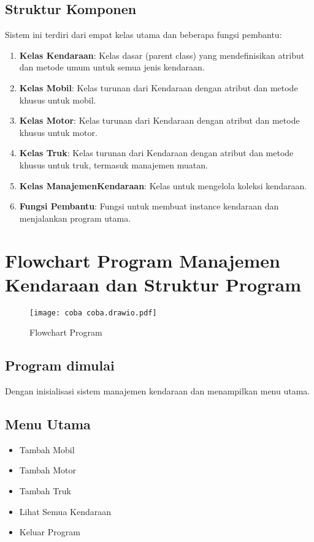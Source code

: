 \documentclass[12pt]{article}
\begin{document}
\subsection{Struktur Komponen}
Sistem ini terdiri dari empat kelas utama dan beberapa fungsi pembantu:

\begin{enumerate}
    \item \textbf{Kelas Kendaraan}: Kelas dasar (parent class) yang mendefinisikan atribut dan metode umum untuk semua jenis kendaraan.
    \item \textbf{Kelas Mobil}: Kelas turunan dari Kendaraan dengan atribut dan metode khusus untuk mobil.
    \item \textbf{Kelas Motor}: Kelas turunan dari Kendaraan dengan atribut dan metode khusus untuk motor.
    \item \textbf{Kelas Truk}: Kelas turunan dari Kendaraan dengan atribut dan metode khusus untuk truk, termasuk manajemen muatan.
    \item \textbf{Kelas ManajemenKendaraan}: Kelas untuk mengelola koleksi kendaraan.
    \item \textbf{Fungsi Pembantu}: Fungsi untuk membuat instance kendaraan dan menjalankan program utama.
\end{enumerate}


\section{Flowchart Program Manajemen Kendaraan dan Struktur Program}
\begin{figure}
    \centering
    \texttt{[image: coba coba.drawio.pdf]}
    \caption{Flowchart Program}
    \label{fig:enter-label}
\end{figure}

\subsection{Program dimulai}
Dengan inisialisasi sistem manajemen kendaraan dan menampilkan menu utama.
\subsection{Menu Utama}
\begin{itemize}
    \item Tambah Mobil
    \item Tambah Motor
    \item Tambah Truk
    \item Lihat Semua Kendaraan
    \item Keluar Program
\end{itemize}
\end{document}
